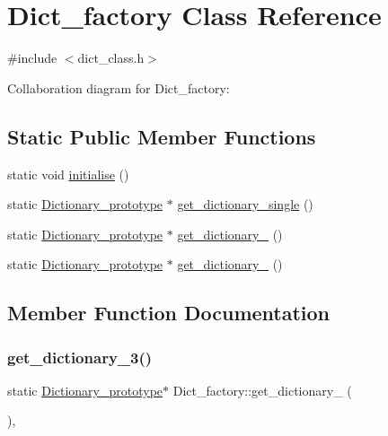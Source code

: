\hypertarget{class_dict__factory}{}\section{Dict\+\_\+factory Class Reference}
\label{class_dict__factory}


{\ttfamily \#include $<$dict\+\_\+class.\+h$>$}



Collaboration diagram for Dict\+\_\+factory\+:
\subsection*{Static Public Member Functions}
\begin{DoxyCompactItemize}
\item 
static void \mbox{\hyperlink{class_dict__factory_a86303714c3e434606f3a5e64cbb1c73f}{initialise}} ()
\item 
static \mbox{\hyperlink{class_dictionary__prototype}{Dictionary\+\_\+prototype}} $\ast$ \mbox{\hyperlink{class_dict__factory_ad9453e2fa9b934df9f19b306a3d81b5e}{get\+\_\+dictionary\+\_\+single}} ()
\item 
static \mbox{\hyperlink{class_dictionary__prototype}{Dictionary\+\_\+prototype}} $\ast$ \mbox{\hyperlink{class_dict__factory_ac14fb190894658176464c677a5a8c92c}{get\+\_\+dictionary\+\_}} ()
\item 
static \mbox{\hyperlink{class_dictionary__prototype}{Dictionary\+\_\+prototype}} $\ast$ \mbox{\hyperlink{class_dict__factory_ac43e0008908230adcf3fea22a37b587b}{get\+\_\+dictionary\+\_}} ()
\end{DoxyCompactItemize}


\subsection{Member Function Documentation}
\mbox{\label{class_dict__factory_ac14fb190894658176464c677a5a8c92c}} 
\subsubsection{\texorpdfstring{get\_dictionary\_3()}{get\_dictionary\_3()}}
{\footnotesize\ttfamily static \mbox{\hyperlink{class_dictionary__prototype}{Dictionary\+\_\+prototype}}$\ast$ Dict\+\_\+factory\+::get\+\_\+dictionary\+\_ (\begin{DoxyParamCaption}{ }\end{DoxyParamCaption})\hspace{0.3cm}{\ttfamily [inline]}, {\ttfamily [static]}}

